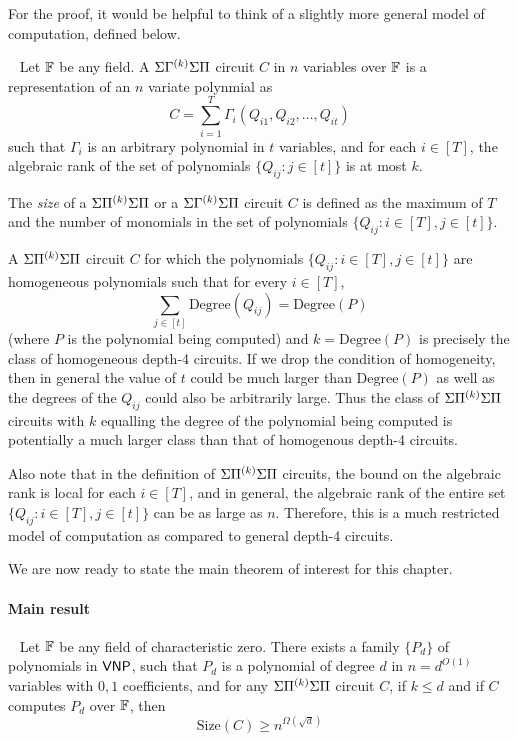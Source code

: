 For the proof, it would be helpful to think of a slightly more general model of computation, defined below.  
\begin{definition}~\label{def:lb modelnew}
Let $\mathbb{F}$ be any field. A $\Sigma{\Gamma^{(k)}}\Sigma\Pi$ circuit $C$ in $n$ variables over $\mathbb{F}$ is a representation of an $n$ variate polynmial as 
\[C =  \sum_{i = 1}^T  \Gamma_i(Q_{i1}, Q_{i2},  \ldots, Q_{it}) \]  
such that $\Gamma_i$ is an arbitrary polynomial in $t$ variables, and for each $i \in [T]$, the algebraic rank of the set of polynomials $\{Q_{ij} : j \in [t]\}$ is at most $k$. 
\end{definition}


The {\it size} of  a $\Sigma{\Pi^{(k)}}\Sigma\Pi$ or a $\Sigma{\Gamma^{(k)}}\Sigma\Pi$ circuit $C$ is defined as the maximum of $T$ and the number of monomials in the set of polynomials $\{Q_{ij} : i \in [T], j \in [t]\}$. 

A $\Sigma{\Pi^{(k)}}\Sigma\Pi$ circuit $C$ for which the polynomials $\{Q_{ij} : i \in [T], j \in [t]\}$ are homogeneous polynomials such that for every $i \in [T]$, \[\sum_{j \in [t]} \text{Degree}(Q_{ij}) = \text{Degree}(P)\] (where $P$ is the polynomial being computed) and $k = \text{Degree}(P)$ is precisely the class of homogeneous depth-4 circuits. If we drop the condition of homogeneity, then in general the value of $t$ could be much larger than $\text{Degree}(P)$ as well as the degrees of the $Q_{ij}$ could also be arbitrarily large. Thus the class of $\Sigma{\Pi^{(k)}}\Sigma\Pi$ circuits with $k$ equalling the degree of the polynomial being computed is potentially a much larger class than that of homogenous depth-4 circuits. 

Also note that in the definition of $\Sigma{\Pi^{(k)}}\Sigma\Pi$ circuits, the bound on the algebraic rank is local for each $i \in [T]$, and in general, the algebraic rank of the entire set $\{Q_{ij} : i \in [T], j \in [t]\}$ can be as large as $n$. Therefore, this is a much restricted model of computation as compared to general depth-$4$ circuits. 

We are now ready to state the main theorem of interest for this chapter. 

\paragraph{Main result}
\begin{theorem}~\label{thm:lower bound}\cite{KS16lowrank, PSS16}
Let $\mathbb{F}$ be any field of characteristic zero. There exists a family $\{P_d\}$ of polynomials in $\mathsf{VNP}$, such that $P_d$ is a polynomial of degree $d$ in $n = d^{O(1)}$ variables with $0,1$ coefficients, and for any $\Sigma{\Pi^{(k)}}\Sigma\Pi$ circuit $C$, if $k \leq d$ and if $C$ computes $P_d$ over $\mathbb{F}$, then $$ \text{Size}(C) \geq n^{\Omega(\sqrt{d})}$$
\end{theorem} 

